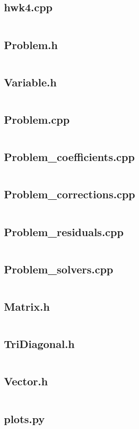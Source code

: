 \documentclass{article}
\begin{document}
\newpage
\subsection*{hwk4.cpp}
\inputminted[fontsize=\scriptsize]{c++}{../hwk4.cpp}

\newpage
\subsection*{Problem.h}
\inputminted[fontsize=\scriptsize]{c++}{../Problem.h}

\newpage
\subsection*{Variable.h}
\inputminted[fontsize=\scriptsize]{c++}{../Variable.h}

\newpage
\subsection*{Problem.cpp}
\inputminted[fontsize=\scriptsize]{c++}{../Problem.cpp}

\newpage
\subsection*{Problem\_coefficients.cpp}
\inputminted[fontsize=\scriptsize]{c++}{../Problem_coefficients.cpp}

\newpage
\subsection*{Problem\_corrections.cpp}
\inputminted[fontsize=\scriptsize]{c++}{../Problem_corrections.cpp}

\newpage
\subsection*{Problem\_residuals.cpp}
\inputminted[fontsize=\scriptsize]{c++}{../Problem_residuals.cpp}

\newpage
\subsection*{Problem\_solvers.cpp}
\inputminted[fontsize=\scriptsize]{c++}{../Problem_solvers.cpp}

\newpage
\subsection*{Matrix.h}
\inputminted[fontsize=\scriptsize]{c++}{../Matrix.h}

\newpage
\subsection*{TriDiagonal.h}
\inputminted[fontsize=\scriptsize]{c++}{../TriDiagonal.h}

\newpage
\subsection*{Vector.h}
\inputminted[fontsize=\scriptsize]{c++}{../Vector.h}

\newpage
\subsection*{plots.py}
\inputminted[fontsize=\scriptsize]{python}{../plots.py}
\end{document}
